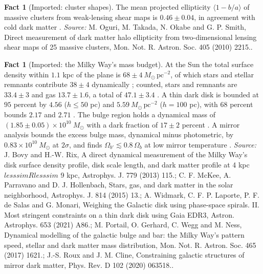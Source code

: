 \documentclass[11pt]{article}
\theoremstyle{definition}
\newtheorem{fact}[theorem]{Fact}
\theoremstyle{plain}
\providecommand{\Msun}{}\renewcommand{\Msun}{M_{\odot}}
\begin{document}
\begin{fact}[Imported: cluster shapes]\label{c:simulations.imported-cluster-shapes}
The mean projected ellipticity $\langle 1 - b/a\rangle$ of massive clusters from weak-lensing shear maps is $0.46 \pm 0.04$, in agreement with cold dark matter \cite{Oguri2010}.
\emph{Source:} M. Oguri, M. Takada, N. Okabe and G. P. Smith, Direct measurement of dark matter halo ellipticity from two-dimensional lensing shear maps of 25 massive clusters, Mon. Not. R. Astron. Soc. 405 (2010) 2215..
\end{fact}

\begin{fact}[Imported: the Milky Way's mass budget]\label{c:simulations.imported-milky-ways-mass-budget}
At the Sun the total surface density within $1.1$ kpc of the plane is $68 \pm 4\ \Msun\,\mathrm{pc^{-2}}$, of which stars and stellar remnants contribute $38 \pm 4$ dynamically \cite{BovyRix2013}; counted, stars and remnants are $33.4 \pm 3$ and gas $13.7 \pm 1.6$, a total of $47.1 \pm 3.4$ \cite{McKee2015}. A thin dark disk is bounded at $95$ percent by $4.56$ ($h \le 50$ pc) and $5.59\ \Msun\,\mathrm{pc^{-2}}$ ($h = 100$ pc), with $68$ percent bounds $2.17$ and $2.71$ \cite{Widmark2021}. The bulge region holds a dynamical mass of $(1.85 \pm 0.05) \times 10^{10}\ \Msun$ with a dark fraction of $17 \pm 2$ percent \cite{Portail2017}. A mirror analysis bounds the excess bulge mass, dynamical minus photometric, by $0.83 \times 10^{10}\ \Msun$ at $2\sigma$, and finds $\Omega_{b'} \lesssim 0.8\,\Omega_{b}$ at low mirror temperature \cite{RouxCline2020}.
\emph{Source:} J. Bovy and H.-W. Rix, A direct dynamical measurement of the Milky Way's disk surface density profile, disk scale length, and dark matter profile at 4 kpc $lesssim R lesssim$ 9 kpc, Astrophys. J. 779 (2013) 115.; C. F. McKee, A. Parravano and D. J. Hollenbach, Stars, gas, and dark matter in the solar neighborhood, Astrophys. J. 814 (2015) 13.; A. Widmark, C. F. P. Laporte, P. F. de Salas and G. Monari, Weighing the Galactic disk using phase-space spirals. II. Most stringent constraints on a thin dark disk using Gaia EDR3, Astron. Astrophys. 653 (2021) A86.; M. Portail, O. Gerhard, C. Wegg and M. Ness, Dynamical modelling of the galactic bulge and bar: the Milky Way's pattern speed, stellar and dark matter mass distribution, Mon. Not. R. Astron. Soc. 465 (2017) 1621.; J.-S. Roux and J. M. Cline, Constraining galactic structures of mirror dark matter, Phys. Rev. D 102 (2020) 063518..
\end{fact}
\end{document}
